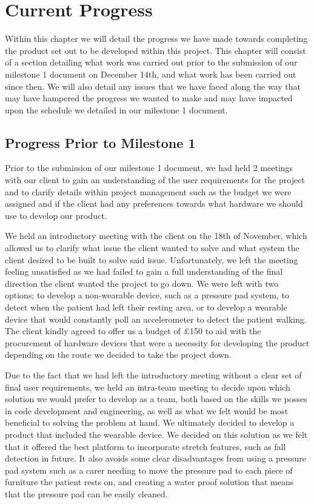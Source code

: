 \chapter{Current Progress}

Within this chapter we will detail the progress we have made towards completing the product set out to be developed within this project. This chapter will consist of a section detailing what work was carried out prior to the submission of our milestone 1 document on December 14th, and what work has been carried out since then. We will also detail any issues that we have faced along the way that may have hampered the progress we wanted to make and may have impacted upon the schedule we detailed in our milestone 1 document.

\section{Progress Prior to Milestone 1}

Prior to the submission of our milestone 1 document, we had held 2 meetings with our client to gain an understanding of the user requirements for the project and to clarify details within project management such as the budget we were assigned and if the client had any preferences towards what hardware we should use to develop our product.

We held an introductory meeting with the client on the 18th of November, which allowed us to clarify what issue the client wanted to solve and what system the client desired to be built to solve said issue. Unfortunately, we left the meeting feeling unsatisfied as we had failed to gain a full understanding of the final direction the client wanted the project to go down. We were left with two options; to develop a non-wearable device, such as a pressure pad system, to detect when the patient had left their resting area, or to develop a wearable device that would constantly poll an accelerometer to detect the patient walking. The client kindly agreed to offer us a budget of £150 to aid with the procurement of hardware devices that were a necessity for developing the product depending on the route we decided to take the project down.

Due to the fact that we had left the introductory meeting without a clear set of final user requirements, we held an intra-team meeting to decide upon which solution we would prefer to develop as a team, both based on the skills we posses in code development and engineering, as well as what we felt would be most beneficial to solving the problem at hand. We ultimately decided to develop a product that included the wearable device. We decided on this solution as we felt that it offered the best platform to incorporate stretch features, such as fall detection in future. It also avoids some clear disadvantages from using a pressure pad system such as a carer needing to move the pressure pad to each piece of furniture the patient rests on, and creating a water proof solution that means that the pressure pad can be easily cleaned.

